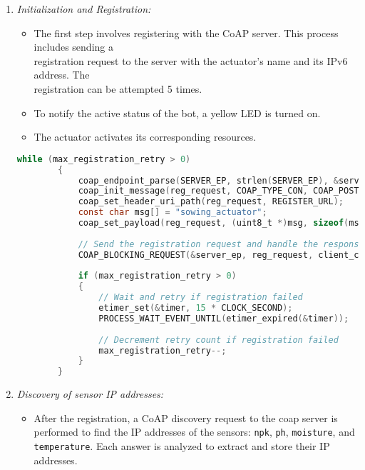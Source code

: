 \begin{enumerate}
    \item \textit{Initialization and Registration:}
          \begin{itemize}
              \item The first step involves registering with the CoAP server. This process includes sending a\\
                    registration request to the server with the actuator's name and its IPv6 address. The\\
                    registration can be attempted 5 times.
              \item To notify the active status of the bot, a yellow LED is turned on.
              \item The actuator activates its corresponding resources.

          \end{itemize}

          \begin{lstlisting}[language=C]
        while (max_registration_retry > 0)
        {
            coap_endpoint_parse(SERVER_EP, strlen(SERVER_EP), &server_ep);
            coap_init_message(reg_request, COAP_TYPE_CON, COAP_POST, 0);
            coap_set_header_uri_path(reg_request, REGISTER_URL);
            const char msg[] = "sowing_actuator";
            coap_set_payload(reg_request, (uint8_t *)msg, sizeof(msg) - 1);
        
            // Send the registration request and handle the response
            COAP_BLOCKING_REQUEST(&server_ep, reg_request, client_chunk_handler);
        
            if (max_registration_retry > 0)
            {
                // Wait and retry if registration failed
                etimer_set(&timer, 15 * CLOCK_SECOND);
                PROCESS_WAIT_EVENT_UNTIL(etimer_expired(&timer));
        
                // Decrement retry count if registration failed
                max_registration_retry--;
            }
        }
    \end{lstlisting}

    \item \textit{Discovery of sensor IP addresses:}
          \begin{itemize}
              \item After the registration, a CoAP discovery request to the coap server is performed to find the IP addresses of the sensors: \texttt{npk}, \texttt{ph}, \texttt{moisture}, and \texttt{temperature}. Each answer is analyzed to extract and store their IP addresses.
          \end{itemize}


\end{enumerate}
